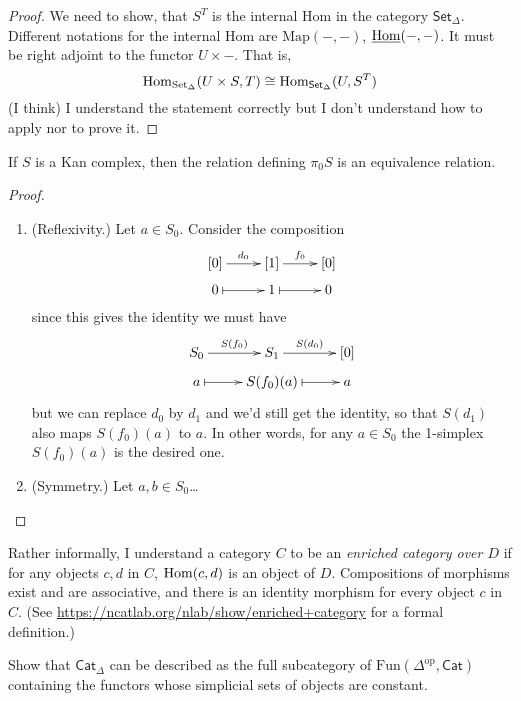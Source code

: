 \begin{proof}
We need to show, that $S^T$ is the internal Hom in the category
$\mathsf{Set}_\Delta$. Different notations for the internal Hom
are $\text{Map}(-,-)$, $\underline{\mathop{\mathrm{Hom}}\nolimits}(-,-)$.
It must be right adjoint to 
the functor $U \times -$.
That is,
$$
\mathop{\mathrm{Hom}}\nolimits_{\text{Set}_\Delta}(U \times S,T)\cong\mathop{\mathrm{Hom}}\nolimits_{\mathsf{Set}_\Delta}(U,S^T)
$$
(I think) I understand the statement correctly
but I don't understand how to apply
\cite[Theorem 1.1.10 (Kan)]{Cisinsky} nor \cite[Remark 1.1.11]{Cisinsky}
to prove it.


\end{proof}

\begin{exercise}[1.1]
\label{exercise-relation-is-equivalence-relation}
If $S$ is a Kan complex, then the relation defining
$\pi_0S$ is an equivalence relation.
\end{exercise}

\begin{proof}
\begin{enumerate}
\item (Reflexivity.) Let $a \in S_0$. Consider the composition
$$
\xymatrixrowsep{0.5em}\xymatrix{
[0]\ar[r]^{d_0}& [1]\ar[r]^{f_0}& [0]\\
0\ar@{|->}[r]& 1\ar@{|->}[r]&0
}
$$
since this gives the identity we must have
$$
\xymatrixrowsep{0.5em}
\xymatrix{
S_0\ar[r]^{S(f_0)}& S_1\ar[r]^{S(d_0)}& [0]\\
a\ar@{|->}[r]& S(f_0)(a)\ar@{|->}[r]&a
}
$$
but we can replace $d_0$ by $d_1$ and we'd still get the identity,
so that $S(d_1)$ also maps $S(f_0)(a)$ to $a$. In other words, 
for any  $a \in S_0$ the 1-simplex $S(f_0)(a)$ is the desired one.
\item (Symmetry.) Let $a,b \in S_0$…
\end{enumerate}
\end{proof}

Rather informally, I understand a category $C$ to be
an {\it enriched category over $D$} if for any objects
$c,d$ in $C$, $\mathop{\mathrm{Hom}}\nolimits(c,d)$ is an object of $D$.
Compositions of morphisms exist and are associative,
and there is an identity morphism for every object $c$ in $C$.
(See \url{https://ncatlab.org/nlab/show/enriched+category} 
for a formal definition.)

\begin{exercise}[1.2]
\label{exercise-enriched-simplicial-set-categories-are-subcategory-of-Fun}
Show that $\mathsf{Cat}_\Delta$ can be described as the full
subcategory of $\text{Fun}(\Delta^{\text{op}},\mathsf{Cat})$
containing the functors whose simplicial sets of objects
are constant.
\end{exercise}

